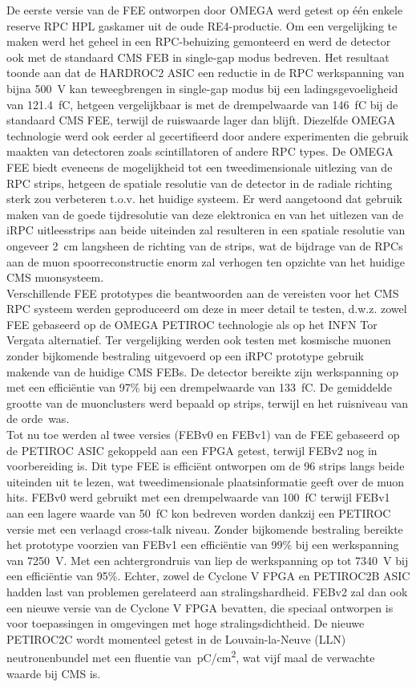 	De eerste versie van de FEE ontworpen door OMEGA werd getest op \'e\'en enkele reserve RPC HPL gaskamer uit de oude RE4-productie. Om een vergelijking te maken werd het geheel in een RPC-behuizing gemonteerd en werd de detector ook met de standaard CMS FEB in single-gap modus bedreven. Het resultaat toonde aan dat de HARDROC2 ASIC een reductie in de RPC werkspanning van bijna \SI{500}{V} kan teweegbrengen in single-gap modus bij een ladingsgevoeligheid van \SI{121.4}{fC}, hetgeen vergelijkbaar is met de drempelwaarde van \SI{146}{fC} bij de standaard CMS FEE, terwijl de ruiswaarde lager dan  blijft. Diezelfde OMEGA technologie werd ook eerder al gecertifieerd door andere experimenten die gebruik maakten van detectoren zoals scintillatoren of andere RPC types. De OMEGA FEE biedt eveneens de mogelijkheid tot een tweedimensionale uitlezing van de RPC strips, hetgeen de spatiale resolutie van de detector in de radiale richting sterk zou verbeteren t.o.v. het huidige systeem. Er werd aangetoond dat gebruik maken van de goede tijdresolutie van deze elektronica en van het uitlezen van de iRPC uitleesstrips aan beide uiteinden zal resulteren in een spatiale resolutie van ongeveer \SI{2}{cm} langsheen de richting van de strips, wat de bijdrage van de RPCs aan de muon spoorreconstructie enorm zal verhogen ten opzichte van het huidige CMS muonsysteem.\\
	Verschillende FEE prototypes die beantwoorden aan de vereisten voor het CMS RPC systeem werden geproduceerd om deze in meer detail te testen, d.w.z. zowel FEE gebaseerd op de OMEGA PETIROC technologie als op het INFN Tor Vergata alternatief. Ter vergelijking werden ook testen met kosmische muonen zonder bijkomende bestraling uitgevoerd op een iRPC prototype gebruik makende van de huidige CMS FEBs. De detector bereikte zijn werkspanning op  met een efficiëntie van 97\% bij een drempelwaarde van \SI{133}{fC}. De gemiddelde grootte van de muonclusters werd bepaald op  strips, terwijl en het ruisniveau van de orde \,\sirate was.\\
	Tot nu toe werden al twee versies (FEBv0 en FEBv1) van de FEE gebaseerd op de PETIROC ASIC gekoppeld aan een FPGA getest, terwijl FEBv2 nog in voorbereiding is. Dit type FEE is efficiënt ontworpen om de 96 strips langs beide uiteinden uit te lezen, wat tweedimensionale plaatsinformatie geeft over de muon hits. FEBv0 werd gebruikt met een drempelwaarde van \SI{100}{fC} terwijl FEBv1 aan een lagere waarde van \SI{50}{fC} kon bedreven worden dankzij een PETIROC versie met een verlaagd cross-talk niveau. Zonder bijkomende bestraling bereikte het prototype voorzien van FEBv1 een efficiëntie van 99\% bij een werkspanning van \SI{7250}{V}. Met een achtergrondruis van  liep de werkspanning op tot \SI{7340}{V} bij een efficiëntie van 95\%. Echter, zowel de Cyclone V FPGA en PETIROC2B ASIC hadden last van problemen gerelateerd aan stralingshardheid. FEBv2 zal dan ook een nieuwe versie van de Cyclone V FPGA bevatten, die speciaal ontworpen is voor toepassingen in omgevingen met hoge stralingsdichtheid. De nieuwe PETIROC2C wordt momenteel getest in de Louvain-la-Neuve (LLN) neutronenbundel met een fluentie van \,\si{pC/cm^2}, wat vijf maal de verwachte waarde bij CMS is.\\
